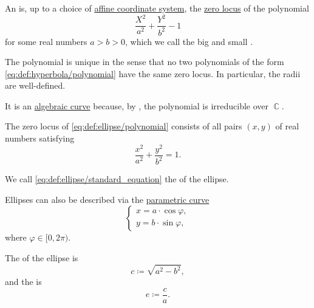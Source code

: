 \begin{definition}\label{def:ellipse}
  An  is, up to a choice of \hyperref[def:affine_coordinate_system]{affine coordinate system}, the \hyperref[def:zero_locus]{zero locus} of the polynomial
  \begin{equation}\label{eq:def:ellipse/polynomial}
    \frac {X^2} {a^2} + \frac {Y^2} {b^2} - 1
  \end{equation}
  for some real numbers \( a > b > 0 \), which we call the big and small .

  The polynomial is unique in the sense that no two polynomials of the form \eqref{eq:def:hyperbola/polynomial} have the same zero locus. In particular, the radii are well-defined.

  It is an \hyperref[def:affine_algebraic_set/curve]{algebraic curve} because, by , the polynomial is irreducible over \( \BbbC \).

  \begin{thmenum}
     The zero locus of \eqref{eq:def:ellipse/polynomial} consists of all pairs \( (x, y) \) of real numbers satisfying
    \begin{equation}\label{eq:def:ellipse/standard_equation}
      \frac {x^2} {a^2} + \frac {y^2} {b^2} = 1.
    \end{equation}

    We call \eqref{eq:def:ellipse/standard_equation} the  of the ellipse.

     Ellipses can also be described via the \hyperref[def:parametric_curve]{parametric curve}
    \begin{equation}\label{eq:def:ellipse/parametric_equation}
      \begin{cases}
        x = a \cdot \cos \varphi, \\
        y = b \cdot \sin \varphi,
      \end{cases}
    \end{equation}
    where \( \varphi \in [0, 2\pi) \).
  \end{thmenum}

   The  of the ellipse is
  \begin{equation*}
    c \coloneq \sqrt{ a^2 - b^2 },
  \end{equation*}
  and the  is
  \begin{equation*}
    e \coloneqq \frac c a.
  \end{equation*}


\end{definition}
